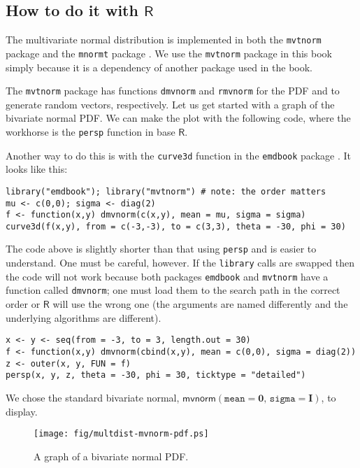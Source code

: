 \subsection{How to do it with \(\mathsf{R}\)}
\label{sec-7-6-1}

The multivariate normal distribution is implemented in both the
\texttt{mvtnorm} package \cite{mvtnorm:1} and the \texttt{mnormt} package
\cite{mnormt}. We use the \texttt{mvtnorm} package in this book simply
because it is a dependency of another package used in the book.

The \texttt{mvtnorm} package has functions \texttt{dmvnorm} and \texttt{rmvnorm} for the
PDF and to generate random vectors, respectively. Let us get started
with a graph of the bivariate normal PDF. We can make the plot with
the following code, where the workhorse is the \texttt{persp} function in
base \(\mathsf{R}\).

Another way to do this is with the \texttt{curve3d} function in the \texttt{emdbook}
package \cite{emdbook}. It looks like this:
\begin{verbatim}
library("emdbook"); library("mvtnorm") # note: the order matters
mu <- c(0,0); sigma <- diag(2)
f <- function(x,y) dmvnorm(c(x,y), mean = mu, sigma = sigma)
curve3d(f(x,y), from = c(-3,-3), to = c(3,3), theta = -30, phi = 30)
\end{verbatim}
The code above is slightly shorter than that using \texttt{persp} and is
easier to understand. One must be careful, however. If the \texttt{library}
calls are swapped then the code will not work because both packages
\texttt{emdbook} and \texttt{mvtnorm} have a function called \texttt{dmvnorm}; one must
load them to the search path in the correct order or \(\mathsf{R}\)
will use the wrong one (the arguments are named differently and the
underlying algorithms are different).

\begin{verbatim}
x <- y <- seq(from = -3, to = 3, length.out = 30)
f <- function(x,y) dmvnorm(cbind(x,y), mean = c(0,0), sigma = diag(2))
z <- outer(x, y, FUN = f)
persp(x, y, z, theta = -30, phi = 30, ticktype = "detailed")
\end{verbatim}

We chose the standard bivariate normal,
\(\mathsf{mvnorm}(\mathtt{mean}=\mathbf{0},\,\mathtt{sigma}=\mathbf{I})\),
to display.

\begin{figure}[ht!]
\centering
\texttt{[image: fig/multdist-mvnorm-pdf.ps]}
\caption[Graph of a bivariate normal PDF]{\label{fig-mvnorm-pdf}\small A graph of a bivariate normal PDF.}
\end{figure}

